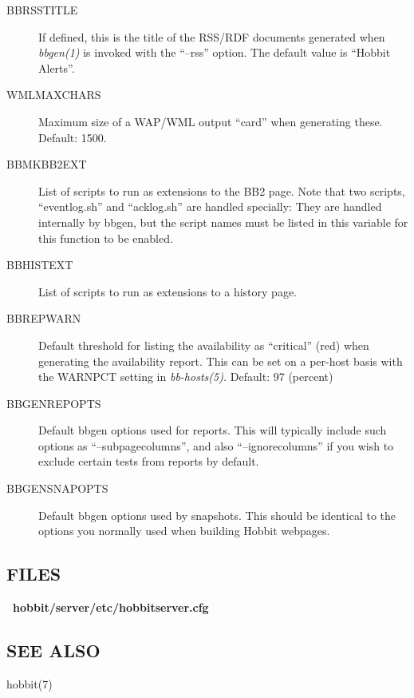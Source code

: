 \begin{description}
 

\item[BBRSSTITLE] If defined, this is the title of the RSS/RDF documents generated when \emph{bbgen(1)}
 is invoked with the ``--rss'' option. The default value is ``Hobbit Alerts''. 

 

\item[WMLMAXCHARS] Maximum size of a WAP/WML output ``card'' when generating these. Default: 1500. 

 

\item[BBMKBB2EXT] List of scripts to run as extensions to the BB2 page. Note that two scripts, ``eventlog.sh'' and ``acklog.sh'' are handled specially: They are handled internally by bbgen, but the script names must be listed in this variable for this function to be enabled. 

 

\item[BBHISTEXT] List of scripts to run as extensions to a history page. 

 

\item[BBREPWARN] Default threshold for listing the availability as ``critical'' (red) when generating the availability report. This can be set on a per-host basis with the WARNPCT setting in \emph{bb-hosts(5).}
 Default: 97 (percent) 

 

\item[BBGENREPOPTS] Default bbgen options used for reports. This will typically include such options as ``--subpagecolumns'', and also ``--ignorecolumns'' if you wish to exclude certain tests from reports by default. 

 

\item[BBGENSNAPOPTS] Default bbgen options used by snapshots. This should be identical to the options you normally used when building Hobbit webpages. 

 


\end{description}

\subsection{FILES}
\textbf{~hobbit/server/etc/hobbitserver.cfg}


 
\subsection{SEE ALSO}
hobbit(7) 

